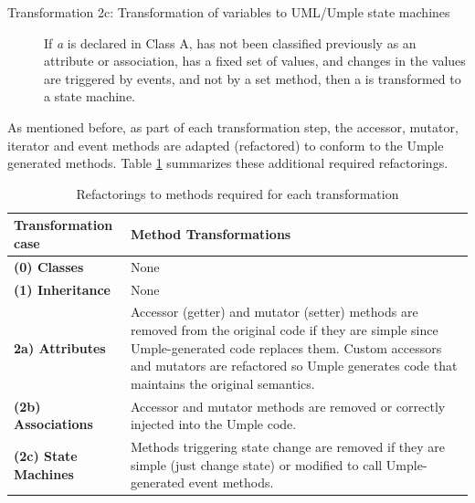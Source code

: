 \begin{description}
\begin{description}
	\item [Transformation 2c: Transformation of variables to UML/Umple state machines]
	If \textit{a} is declared in Class A, has not been classified previously as an attribute or association, has a fixed set of values, and changes in the values are triggered by events, and not by a set method, then a is transformed to a state machine.	
\end{description}
\end{description}

As mentioned before, as part of each transformation step, the accessor, mutator, iterator and event methods are adapted (refactored) to conform to the Umple generated methods. Table \ref{table:transformations} summarizes these additional required refactorings. 

\begin{table}[htbp]
	\caption{Refactorings to methods required for each transformation}
	\label{table:transformations}
    \centering
    \begin{tabularx}{\textwidth}{| X | X |}
        \toprule
        \rowcolor[HTML]{BBDAFF}
       \textbf{ Transformation case  }   & \textbf{Method Transformations}
        \\ \hline
        \textbf{(0)  Classes }        & None      \\ \hline
        \textbf{(1)  Inheritance}     & None       \\ \hline
        \textbf{2a)  Attributes}      & 
        Accessor (getter) and mutator (setter) methods are removed from the original code if they are simple since 		Umple-generated code replaces them. Custom accessors and mutators are refactored so Umple generates code 			that maintains the original
        semantics.         		\\ \hline
        \textbf{(2b) Associations }   & 
 		Accessor and mutator methods are removed or correctly injected into the Umple code.        
		\\ \hline
        \textbf{(2c) State Machines  }  & 
		Methods triggering state change are removed if they are simple (just change state) or modified to call 				Umple-generated event methods.  	
		\\ \hline
    \end{tabularx}
\end{table}

